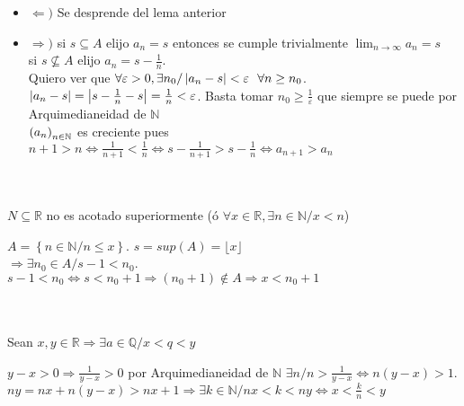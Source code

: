 \documentclass[a4paper,10pt]{article}
\begin{document}
\ifversionlarga
\begin{demo}
	\begin{itemize}
		\item $\Leftarrow)$ Se desprende del lema anterior
		\item $\Rightarrow)$ si $s \subseteq A$ elijo $a_n = s$ entonces se cumple trivialmente $\lim_{n \to \infty} a_n = s$ \\
		si $s \not\subseteq A$ elijo $a_n = s-\frac{1}{n}$. \\
		Quiero ver que $\forall \varepsilon > 0, \exists n_0 / \left\lvert a_n-s\right\rvert < \varepsilon \ \ \forall n \geq n_0$. \\
		$\left\lvert a_n-s\right\rvert = \left\lvert s-\frac{1}{n}-s\right\rvert = \frac{1}{n} < \varepsilon$. Basta tomar $n_0 \geq \frac{1}{\varepsilon}$ que siempre se puede por Arquimedianeidad de $\mathbb{N}$ \\
		$\left( {a}_{n} \right)_{n \in \mathbb{N}}$ es creciente pues $n+1>n \Leftrightarrow \frac{1}{n+1}<\frac{1}{n} \Leftrightarrow s-\frac{1}{n+1}>s-\frac{1}{n} \Leftrightarrow a_{n+1} > a_{n}$
	\end{itemize}
\end{demo}
\fi
\hspace*{\fill} \\
\hspace*{\fill} \\
 $N \subseteq \mathbb{R}$ no es acotado superiormente (ó $\forall x \in \mathbb{R}, \exists n \in \mathbb{N} / x < n$)
\ifversionlarga
\begin{demo}
	$A = \left\lbrace n \in \mathbb{N} / n \leq x \right\rbrace$. $s = sup(A) = \lfloor x \rfloor$ \\
	$\Rightarrow \exists n_0 \in A / s - 1 < n_0$.\ \ $s - 1 < n_0 \Leftrightarrow s < n_0 + 1 \Rightarrow (n_0+1) \not\in A \Rightarrow x < n_0 + 1$ 
\end{demo}
\fi
\hspace*{\fill} \\
\hspace*{\fill} \\
 Sean $x,y \in \mathbb{R} \Rightarrow \exists a \in \mathbb{Q} / x < q < y$
\ifversionlarga
\begin{demo}
	$y - x > 0 \Rightarrow \frac{1}{y-x} > 0$ por Arquimedianeidad de $\mathbb{N}$ $\exists n / n > \frac{1}{y-x} \Leftrightarrow n(y-x) > 1$. \\
	$ny = nx + n(y-x) > nx + 1 \Rightarrow \exists k \in \mathbb{N} / nx < k < ny \Leftrightarrow x < \frac{k}{n} < y$
\end{demo}
\end{document}
